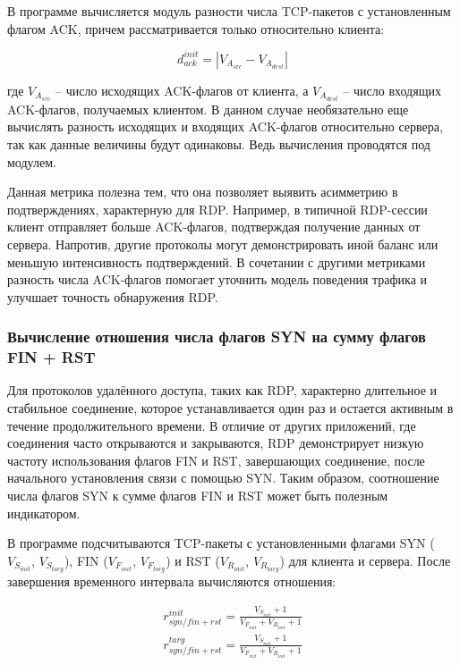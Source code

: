 \documentclass[spec, och, diploma]{SCWorks}
\begin{document}
В программе вычисляется модуль разности числа TCP-пакетов с установленным флагом ACK, причем рассматривается только относительно клиента:

\begin{equation}
  d_{ack}^{init} = | V_{A_{src}} - V_{A_{dest}} |
\end{equation}

где $V_{A_{src}}$ -- число исходящих ACK-флагов от клиента, а $V_{A_{dest}}$ -- число входящих ACK-флагов, получаемых клиентом. В данном случае необязательно
еще вычислять разность исходящих и входящих ACK-флагов относительно сервера, так как данные величины будут одинаковы. Ведь вычисления проводятся под модулем.

Данная метрика полезна тем, что она позволяет выявить асимметрию в подтверждениях, характерную для RDP. Например, в типичной RDP-сессии 
клиент отправляет больше ACK-флагов, подтверждая получение данных от сервера. Напротив, другие протоколы могут демонстрировать иной баланс 
или меньшую интенсивность подтверждений. В сочетании с другими метриками разность числа ACK-флагов помогает уточнить модель поведения трафика 
и улучшает точность обнаружения RDP.

\subsubsection{Вычисление отношения числа флагов SYN на сумму флагов FIN + RST}


Для протоколов удалённого доступа, таких как RDP, характерно длительное и стабильное 
соединение, которое устанавливается один раз и остается активным в течение продолжительного времени. В отличие от других приложений, 
где соединения часто открываются и закрываются, RDP демонстрирует низкую частоту использования флагов FIN и RST, завершающих соединение, 
после начального установления связи с помощью SYN. Таким образом, соотношение числа флагов SYN к сумме флагов FIN и RST может быть полезным индикатором.

В программе подсчитываются TCP-пакеты с установленными флагами SYN ($V_{S_{init}}$, $V_{S_{targ}}$), FIN ($V_{F_{init}}$, $V_{F_{targ}}$) и RST 
($V_{R_{init}}$, $V_{R_{targ}}$) для клиента и сервера. После завершения временного интервала вычисляются отношения:

\begin{equation}
  \begin{aligned}
    r_{syn/fin+rst}^{init} = \frac{V_{S_{init}} + 1}{V_{F_{init}} + V_{R_{init}} + 1} \\
    r_{syn/fin+rst}^{targ} = \frac{V_{S_{init}} + 1}{V_{F_{init}} + V_{R_{init}} + 1}
  \end{aligned}
\end{equation}
\end{document}
